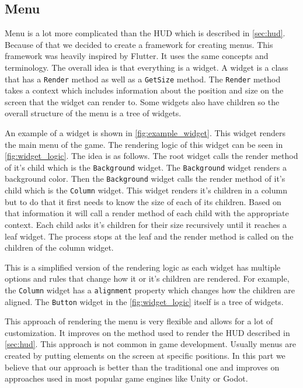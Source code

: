 \subsection{Menu} \label{sec:menu}
Menu is a lot more complicated than the HUD which is described in \autoref{sec:hud}.
Because of that we decided to create a framework for creating menus.
This framework was heavily inspired by Flutter.
It uses the same concepts and terminology.
The overall idea is that everything is a widget.
A widget is a class that has a \texttt{Render} method as well as a \texttt{GetSize} method.
The \texttt{Render} method takes a context which includes information about the position and size on the screen that the widget can render to.
Some widgets also have children so the overall structure of the menu is a tree of widgets.

An example of a widget is shown in \autoref{fig:example_widget}.
This widget renders the main menu of the game.
The rendering logic of this widget can be seen in \autoref{fig:widget_logic}.
The idea is as follows.
The root widget calls the render method of it's child which is the \texttt{Background} widget.
The \texttt{Background} widget renders a background color.
Then the \texttt{Background} widget calls the render method of it's child which is the \texttt{Column} widget.
This widget renders it's children in a column but to do that it first needs to know the size of each of its children.
Based on that information it will call a render method of each child with the appropriate context.
Each child asks it's children for their size recursively until it reaches a leaf widget.
The process stops at the leaf and the render method is called on the children of the column widget.

This is a simplified version of the rendering logic as each widget has multiple options and rules that change how it or it's children are rendered.
For example, the \texttt{Column} widget has a \texttt{alignment} property which changes how the children are aligned.
The \texttt{Button} widget in the \autoref{fig:widget_logic} itself is a tree of widgets.

This approach of rendering the menu is very flexible and allows for a lot of customization.
It improves on the method used to render the HUD described in \autoref{sec:hud}.
This approach is not common in game development.
Usually menus are created by putting elements on the screen at specific positions. %
In this part we believe that our approach is better than the traditional one and improves on approaches used in most popular game engines like Unity or Godot.

